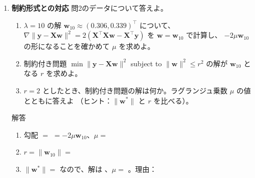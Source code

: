 \documentclass[a4paper,dvipdfmx]{jsarticle}
\newcommand{\提出期限}{2026年11月2日（月）}
\newcommand{\学籍番号}{0000000}
\newcommand{\氏名}{氏名を書く}
\newcommand{\提出日}{2026年11月2日}
\newenvironment{answer}{\begin{itembox}[l]{解答}}{\end{itembox}}
\begin{document}
\begin{enumerate}
  \item \textbf{制約形式との対応}\quad
    問2のデータについて答えよ。
    \begin{enumerate}
      \item $\lambda = 10$ の解 $\bm{w}_{10} \approx (0.306, 0.339)^\top$ について、
        $\nabla\|\bm{y} - \bm{X}\bm{w}\|^2 = 2(\bm{X}^\top\bm{X}\bm{w} - \bm{X}^\top\bm{y})$ を $\bm{w} = \bm{w}_{10}$ で計算し、
        $-2\mu\bm{w}_{10}$ の形になることを確かめて $\mu$ を求めよ。
      \item 制約付き問題 $\min \|\bm{y} - \bm{X}\bm{w}\|^2$ subject to $\|\bm{w}\|^2 \leq r^2$ の解が $\bm{w}_{10}$ となる $r$ を求めよ。
      \item $r = 2$ としたとき、制約付き問題の解は何か。ラグランジュ乗数 $\mu$ の値とともに答えよ
        （ヒント：$\|\bm{w}^*\|$ と $r$ を比べる）。
    \end{enumerate}
    \begin{answer}
      \begin{enumerate}
        \item 勾配 $= $ \phantom{XXXXXXXXXXXX} $= -2\mu\bm{w}_{10}$、$\mu = $ \phantom{XXXX}
          \vspace{6mm}
        \item $r = \|\bm{w}_{10}\| = $ \phantom{XXXXXX}
          \vspace{4mm}
        \item $\|\bm{w}^*\| = $ \phantom{XXXXXX} なので、解は \phantom{XXXXXXXXXX}、$\mu = $ \phantom{XXXX}。理由：
          \vspace{8mm}
      \end{enumerate}
    \end{answer}


\end{enumerate}
\end{document}
